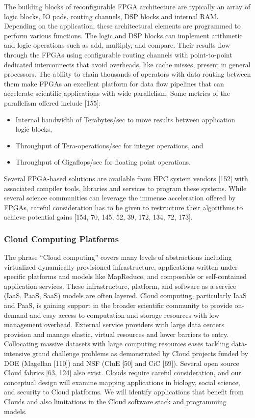 The building blocks of reconfigurable FPGA architecture are typically an array of logic blocks,
IO pads, routing channels, DSP blocks and internal RAM. Depending on the application, these
architectural elements are programmed to perform various functions. The logic and DSP blocks can
implement arithmetic and logic operations such as add, multiply, and compare. Their results flow
through the FPGAs using configurable routing channels with point-to-point dedicated interconnects
that avoid overheads, like cache misses, present in general processors. The ability to chain thousands
of operators with data routing between them make FPGAs an excellent platform for data flow
pipelines that can accelerate scientific applications with wide parallelism. Some metrics of the
parallelism offered include [155]:
\begin{itemize}
\item Internal bandwidth of Terabytes/sec to move results between application logic blocks,
\item Throughput of Tera-operations/sec for integer operations, and
\item Throughput of Gigaflops/sec for floating point operations.
\end{itemize}
Several FPGA-based solutions are available from HPC system vendors [152] with associated
compiler tools, libraries and services to program these systems. While several science communities
can leverage the immense acceleration offered by FPGAs, careful consideration has to be given to
restructure their algorithms to achieve potential gains [154, 70, 145, 52, 39, 172, 134, 72, 173].


\subsubsection{Cloud Computing Platforms}
The phrase “Cloud computing” covers many levels of abstractions including virtualized dynamically
provisioned infrastructure, applications written under specific platforms and models like MapReduce,
and composable or self-contained application services. These infrastructure, platform, and software
as a service (IaaS, PaaS, SaaS) models are often layered. Cloud computing, particularly IaaS and
PaaS, is gaining support in the broader scientific community to provide on-demand and easy access
to computation and storage resources with low management overhead. External service providers
with large data centers provision and manage elastic, virtual resources and lower barriers to entry.
Collocating massive datasets with large computing resources eases tackling data-intensive grand
challenge problems as demonstrated by Cloud projects funded by DOE (Magellan [110]) and NSF
(CluE [50] and CiC [69]). Several open source Cloud fabrics [63, 124] also exist.
Clouds require careful consideration, and our conceptual design will examine mapping applications
in biology, social science, and security to Cloud platforms. We will identify applications
that benefit from Clouds and also limitations in the Cloud software stack and programming models.

